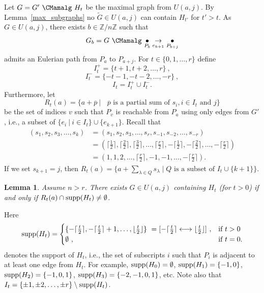 \documentclass{amsproc}
\newtheorem{lemma}[theorem]{Lemma}
\theoremstyle{definition}
\theoremstyle{remark}
\numberwithin{equation}{section}
\newcommand{\Z}{{\mathbb Z}}
\newcommand{\supp}{{\rm supp}}
\newcommand{\interval}{\longleftrightarrow}
\begin{document}
Let $G=G'\ \CMamalg\ H_t$ be the maximal graph from $U(a,j)$. By Lemma~\ref{max_subgraphs} no $\tilde G\in U(a,j)$ can contain $H_{t'}$ for $t' > t$. 
As $G\in U(a,j)$, there exists $b\in \Z/n\Z$ such that 
\[ G_b=G\ \CMamalg\ \underset{P_b}\bullet\underset{e_{k+1}}\rightarrow\underset{P_{b+j}}\bullet\]
admits an Eulerian path from $P_a$ to $P_{a+j}$. For $t\in\{0,1,\dots,r\}$ define
\[I_t^+=\{t+1,t+2,\dots, r\}\ ,\]
\[I_t^-=\{-t-1,-t-2,\dots,-r\}\ ,\]
\[I_t=I_t^+\cup I_t^- .\]
Furthermore, let
\[R_t(a)=\{a+\overline p\ |\ \text{ $\overline p$ is a partial sum of $s_i,i\in I_t$ and $j$}\}\]
be the set of indices $v$ such that $P_v$ is reachable from $P_a$ using only edges from $G'$, i.e.,
a subset of $\{e_i\ |\ i\in I_t\} \cup \{e_{k+1}\}$. Recall that 
\begin{align*}
(s_1,s_2,s_3,\dots,s_k)&=(s_1,s_2,s_3,\dots,s_r,s_{-1},s_{-2},\dots,s_{-r})\\
&=\left(\lceil \frac {1} {2} \rceil,\lceil \frac {2} {2} \rceil,\lceil \frac {3} {2} \rceil,\dots,\lceil \frac {r} {2} \rceil,-\lceil \frac {1} {2} \rceil,-\lceil \frac {2} {2} \rceil,\dots,-\lceil \frac {r} {2} \rceil\right)\\
&=(1,1,2,\dots,\lceil\frac r 2 \rceil,-1,-1,\dots,-\lceil \frac r 2 \rceil).
\end{align*}
If we set $s_{k+1} = j$, then 
$R_t(a)=\{ a + \sum_{\lambda\in Q} s_\lambda \; | \; \text{$Q$ is a subset of $I_t\cup\{k+1\}$}\}$.

\begin{lemma}\label{reachable_H}
Assume $n>r$. There exists $G\in U(a,j)$ containing $H_t$ (for $t>0$) if and only if $R_t(a)\cap \supp(H_t)\neq\emptyset$.
\end{lemma}

Here
\[
\supp(H_t)=\begin{cases}
\{-\lceil \frac t 2 \rceil,-\lceil \frac t 2 \rceil+1,\dots,\lfloor \frac t 2 \rfloor\}\ =
[-\lceil \frac t 2 \rceil\interval \lfloor \frac t 2 \rfloor]\ , &\text{if $t>0$}\\
\emptyset\ , &\text{if $t=0$.}
\end{cases}
\]
denotes the support of $H_t$, i.e., the set of subscripts $i$ such that $P_i$ is adjacent to at least one edge from $H_t$. 
For example, $\supp(H_0)=\emptyset$,
$\supp(H_1)=\{-1,0\}$,
$\supp(H_2)=\{-1,0,1\}$,
$\supp(H_3)=\{-2,-1,0,1\}$, etc. Note also that $I_t = \{\pm 1,\pm 2,\dots,\pm r\} \setminus \supp(H_t)$.
\end{document}
